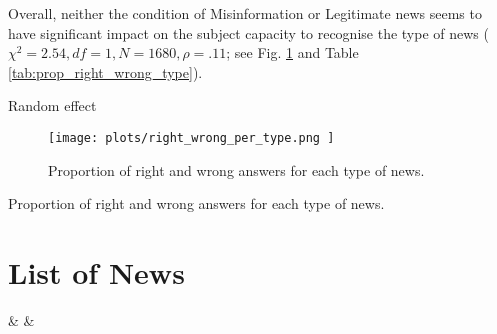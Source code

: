 \documentclass{article}
\begin{document}
Overall, neither the condition of Misinformation or Legitimate news seems to have significant impact on the subject capacity to recognise the type of news ({$\chi^2= 2.54,  \textit{df}=1, N=1680, \rho=.11 $}; see Fig. \ref{fig:prop_right_wrong_type} and Table \ref{tab:prop_right_wrong_type}).

Random effect


\begin{figure}[hbt]
    \centering
    \texttt{[image: plots/right\_wrong\_per\_type.png
    ]}
    \caption{Proportion of right and wrong answers for each type of news.}
    \label{fig:prop_right_wrong_type}
\end{figure}


\begin{table}[htb!]
    \centering
    \caption{Proportion of right and wrong answers for each type of news.}
    \label{tab:prop_right_wrong_type}
\end{table}

\appendix

\section{List of News}
\label{sec:list_news}


%
{\csvcoli & \csvcolii & \csvcoliii}

\bigskip
\end{document}
